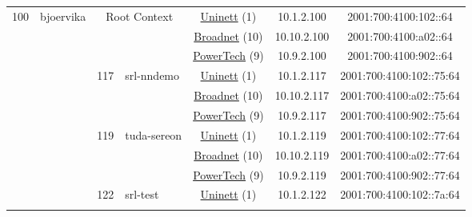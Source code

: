 \begin{small}
\begin{center}
\begin{longtable}{|c|c|c|c|c|c|c|c|}
 \multirow{48}{*}{\tiny{100}} & \multicolumn{1}{|l|}{\multirow{48}{*}{\tiny{bjoervika}}} & \multicolumn{2}{|c|}{\multirow{3}{*}{\tiny{Root Context}}} & \multicolumn{2}{|c|}{\tiny{\href{https://www.uninett.no}{Uninett} (1)}} & \tiny{10.1.2.100} & \tiny{2001:700:4100:102::64} \\* \cline{5-5}\cline{6-6}\cline{7-7}\cline{8-8}
  &  & \multicolumn{2}{|c|}{} & \multicolumn{2}{|c|}{\tiny{\href{https://www.broadnet.no}{Broadnet} (10)}} & \tiny{10.10.2.100} & \tiny{2001:700:4100:a02::64} \\* \cline{5-5}\cline{6-6}\cline{7-7}\cline{8-8}
  &  & \multicolumn{2}{|c|}{} & \multicolumn{2}{|c|}{\tiny{\href{http://www.powertech.no}{PowerTech} (9)}} & \tiny{10.9.2.100} & \tiny{2001:700:4100:902::64} \\* \cline{3-3}\cline{4-4}\cline{5-5}\cline{6-6}\cline{7-7}\cline{8-8}
  &  & \multirow{3}{*}{\tiny{117}} & \multicolumn{1}{|l|}{\multirow{3}{*}{\tiny{srl-nndemo}}} & \multicolumn{2}{|c|}{\tiny{\href{https://www.uninett.no}{Uninett} (1)}} & \tiny{10.1.2.117} & \tiny{2001:700:4100:102::75:64} \\* \cline{5-5}\cline{6-6}\cline{7-7}\cline{8-8}
  &  &  &  & \multicolumn{2}{|c|}{\tiny{\href{https://www.broadnet.no}{Broadnet} (10)}} & \tiny{10.10.2.117} & \tiny{2001:700:4100:a02::75:64} \\* \cline{5-5}\cline{6-6}\cline{7-7}\cline{8-8}
  &  &  &  & \multicolumn{2}{|c|}{\tiny{\href{http://www.powertech.no}{PowerTech} (9)}} & \tiny{10.9.2.117} & \tiny{2001:700:4100:902::75:64} \\* \cline{3-3}\cline{4-4}\cline{5-5}\cline{6-6}\cline{7-7}\cline{8-8}
  &  & \multirow{3}{*}{\tiny{119}} & \multicolumn{1}{|l|}{\multirow{3}{*}{\tiny{tuda-sereon}}} & \multicolumn{2}{|c|}{\tiny{\href{https://www.uninett.no}{Uninett} (1)}} & \tiny{10.1.2.119} & \tiny{2001:700:4100:102::77:64} \\* \cline{5-5}\cline{6-6}\cline{7-7}\cline{8-8}
  &  &  &  & \multicolumn{2}{|c|}{\tiny{\href{https://www.broadnet.no}{Broadnet} (10)}} & \tiny{10.10.2.119} & \tiny{2001:700:4100:a02::77:64} \\* \cline{5-5}\cline{6-6}\cline{7-7}\cline{8-8}
  &  &  &  & \multicolumn{2}{|c|}{\tiny{\href{http://www.powertech.no}{PowerTech} (9)}} & \tiny{10.9.2.119} & \tiny{2001:700:4100:902::77:64} \\* \cline{3-3}\cline{4-4}\cline{5-5}\cline{6-6}\cline{7-7}\cline{8-8}
  &  & \multirow{3}{*}{\tiny{122}} & \multicolumn{1}{|l|}{\multirow{3}{*}{\tiny{srl-test}}} & \multicolumn{2}{|c|}{\tiny{\href{https://www.uninett.no}{Uninett} (1)}} & \tiny{10.1.2.122} & \tiny{2001:700:4100:102::7a:64} \\* \cline{5-5}\cline{6-6}\cline{7-7}\cline{8-8}

\end{longtable}
\end{center}
\end{small}
